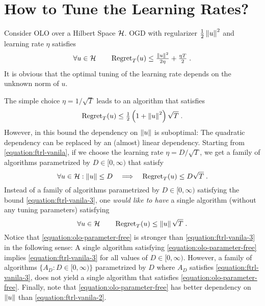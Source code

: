 \section{How to Tune the Learning Rates?}
\label{section:learning-rates}

Consider \ac{OLO} over a Hilbert Space $\mathcal{H}$. \ac{OGD} with regularizer
$\tfrac{1}{2}\left\|{u}\right\|^2$ and learning rate $\eta$ satisfies~\citep{Shalev-Shwartz-2011}
%
\begin{equation}
\label{equation:ftrl-vanila}
\forall u \in \mathcal{H} \qquad \operatorname{Regret}_T(u) \le \tfrac{\left\|{u}\right\|^2}{2\eta} + \tfrac{\eta T}{2} \; .
\end{equation}
%
It is obvious that the optimal tuning of the learning rate depends on the
unknown norm of $u$.

The simple choice $\eta = 1/\sqrt{T}$ leads to an algorithm that satisfies
%
\begin{equation}
\label{equation:ftrl-vanila-2}
\operatorname{Regret}_T(u) \le \tfrac{1}{2}\left(1+\left\|{u}\right\|^2\right)\sqrt{T} \; .
\end{equation}
%
However, in this bound the dependency on $\left\|{u}\right\|$ is suboptimal: The quadratic dependency can be replaced by an (almost) linear
dependency.
Starting from \eqref{equation:ftrl-vanila}, if we choose the learning rate $\eta =
D/\sqrt{T}$, we get a family of algorithms parametrized by $D \in [0,\infty)$
that satisfy
%
\begin{equation}
\label{equation:ftrl-vanila-3}
\forall u \in \mathcal{H} : \left\|{u}\right\| \le D \quad  \Longrightarrow \quad \operatorname{Regret}_T(u) \le D \sqrt{T} \; .
\end{equation}
%
Instead of a family of algorithms parametrized by $D \in [0,\infty)$ satisfying
the bound \eqref{equation:ftrl-vanila-3}, one \emph{would like
to have} a single algorithm (without any tuning parameters) satisfying
%
\begin{equation}
\label{equation:olo-parameter-free}
\forall u \in \mathcal{H} \qquad \operatorname{Regret}_T(u) \le \left\|{u}\right\| \sqrt{T} \; .
\end{equation}
%
Notice that \eqref{equation:olo-parameter-free} is stronger than
\eqref{equation:ftrl-vanila-3} in the following sense: A single algorithm
satisfying \eqref{equation:olo-parameter-free} implies
\eqref{equation:ftrl-vanila-3} for all values of $D \in [0,\infty)$. However,
a family of algorithms $\{A_D : D \in [0,\infty)\}$ parametrized by $D$ where
$A_D$ satisfies \eqref{equation:ftrl-vanila-3}, does not yield a single
algorithm that satisfies \eqref{equation:olo-parameter-free}.  Finally, note
that \eqref{equation:olo-parameter-free} has better dependency on $\left\|{u}\right\|$
than \eqref{equation:ftrl-vanila-2}.

